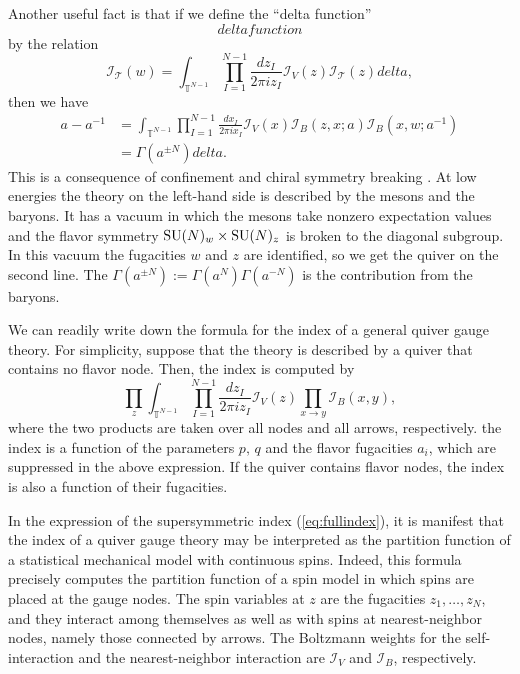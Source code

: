 Another useful fact is that if we define the ``delta function''
\begin{equation}
deltafunction
\end{equation}
by the relation
\begin{equation}
    \mathcal{I}_{\mathcal{T}}(w)  
      =  \int_{\mathbb{T}^{N-1}}\prod_{I=1}^{N-1}\frac{dz_{I}}{2\pi iz_{I}}  
            \mathcal{I}_{V}(z)\mathcal{I}_{\mathcal{T}}(z)delta,
\end{equation}
 then we have 
\begin{align}
    a-a^{-1}  
      &  =  \int_{\mathbb{T}^{N-1}}\prod_{I=1}^{N-1}\frac{dx_{I}}{2\pi ix_{I}}  
                \mathcal{I}_{V}(x)\mathcal{I}_{B}(z,x;a)\mathcal{I}_{B}\left(x,w;a^{-1}\right)  \nonumber  \\
      &  =  \Gamma\left(a^{\pm N}\right)delta.
\end{align}
This is a consequence of confinement and chiral symmetry breaking
\cite{Seiberg:1994bz, Spiridonov:2014cxa}. At low energies the theory on
the left-hand side is described by the mesons and the baryons. It
has a vacuum in which the mesons take nonzero expectation values and
the flavor symmetry $\mathrm{SU}(N)_{w}\times \mathrm{SU}(N)_{z}$ is broken to the
diagonal subgroup. In this vacuum the fugacities $w$ and $z$ are
identified, so we get the quiver on the second line. The $\Gamma(a^{\pm N}):=\Gamma(a^{N})\Gamma(a^{-N})$
is the contribution from the baryons. 

We can readily write down the formula for the index of a general quiver
gauge theory. For simplicity, suppose that the theory is described
by a quiver that contains no flavor node. Then, the index is computed
by 
\begin{equation}
    \prod_{z}\int_{\mathbb{T}^{N-1}}\prod_{I=1}^{N-1}\frac{dz_{I}}{2\pi iz_{I}}\mathcal{I}_{V}(z)
      \prod_{x \to y}\mathcal{I}_{B}(x,y),  \label{eq:fullindex}
\end{equation}
 where the two products are taken over all nodes and all arrows, respectively.
the index is a function of the parameters $p,\,q$ and the flavor
fugacities $a_{i}$, which are suppressed in the above expression.
If the quiver contains flavor nodes, the index is also a function
of their fugacities. 

In the expression of the supersymmetric index (\ref{eq:fullindex}),
it is manifest that the index of a quiver gauge theory may be interpreted
as the partition function of a statistical mechanical model with continuous
spins. Indeed, this formula precisely computes the partition function
of a spin model in which spins are placed at the gauge nodes. The
spin variables at $z$ are the fugacities $z_{1},\ldots,z_{N}$, and
they interact among themselves as well as with spins at nearest-neighbor
nodes, namely those connected by arrows. The Boltzmann weights for
the self-interaction and the nearest-neighbor interaction are $\mathcal{I}_{V}$
and $\mathcal{I}_{B}$, respectively. 


